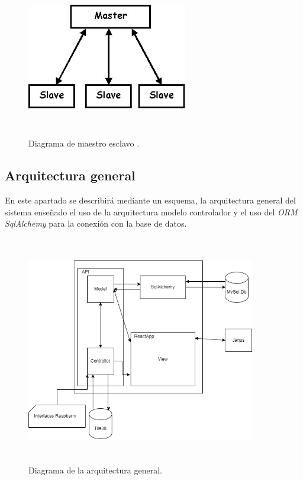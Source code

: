 \FloatBarrier
\begin{figure}[h]
    \centering
    \includegraphics[width=7cm,height=7cm,keepaspectratio]{img/masterslave.jpg}
    \caption{Diagrama de maestro esclavo \cite{masterslaveimg}.}
    \label{fig:diagram_seceunce_guide}
\end{figure}
\FloatBarrier
\subsection{Arquitectura general}
En este apartado se describirá mediante un esquema, la arquitectura general del sistema enseñado el uso de la arquitectura modelo controlador y el uso del \textit{ORM SqlAlchemy} para la conexión con la base de datos.
\FloatBarrier
\begin{figure}[h]
    \centering
    \includegraphics[width=10cm,height=10cm,keepaspectratio]{img/Esquema general del proyecto.drawio (1).png}
    \caption{Diagrama de la arquitectura general.}
    \label{fig:diagram_seceunce_guide}
\end{figure}
\FloatBarrier
